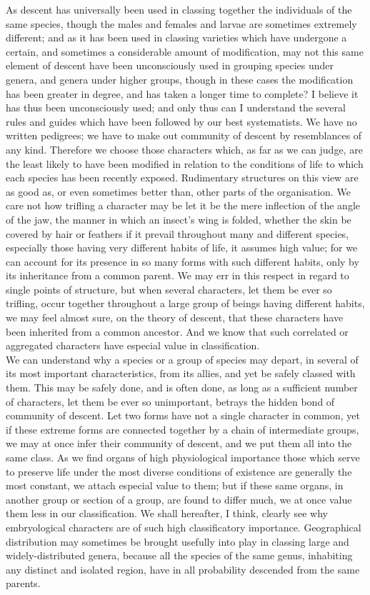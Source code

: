\indent As descent has universally been used in classing together the individuals of the same species, though the males and females and larvae are sometimes extremely different; and as it has been used in classing varieties which have undergone a certain, and sometimes a considerable amount of modification, may not this same element of descent have been unconsciously used in grouping species under genera, and genera under higher groups, though in these cases the modification has been greater in degree, and has taken a longer time to complete? I believe it has thus been unconsciously used; and only thus can I understand the several rules and guides which have been followed by our best systematists. We have no written pedigrees; we have to make out community of descent by resemblances of any kind. Therefore we choose those characters which, as far as we can judge, are the least likely to have been modified in relation to the conditions of life to which each species has been recently exposed. Rudimentary structures on this view are as good as, or even sometimes better than, other parts of the organisation. We care not how trifling a character may be let it be the mere inflection of the angle of the jaw, the manner in which an insect's wing is folded, whether the skin be covered by hair or feathers if it prevail throughout many and different species, especially those having very different habits of life, it assumes high value; for we can account for its presence in so many forms with such different habits, only by its inheritance from a common parent. We may err in this respect in regard to single points of structure, but when several characters, let them be ever so trifling, occur together throughout a large group of beings having different habits, we may feel almost sure, on the theory of descent, that these characters have been inherited from a common ancestor. And we know that such correlated or aggregated characters have especial value in classification.~\\
\indent We can understand why a species or a group of species may depart, in several of its most important characteristics, from its allies, and yet be safely classed with them. This may be safely done, and is often done, as long as a sufficient number of characters, let them be ever so unimportant, betrays the hidden bond of community of descent. Let two forms have not a single character in common, yet if these extreme forms are connected together by a chain of intermediate groups, we may at once infer their community of descent, and we put them all into the same class. As we find organs of high physiological importance those which serve to preserve life under the most diverse conditions of existence are generally the most constant, we attach especial value to them; but if these same organs, in another group or section of a group, are found to differ much, we at once value them less in our classification. We shall hereafter, I think, clearly see why embryological characters are of such high classificatory importance. Geographical distribution may sometimes be brought usefully into play in classing large and widely-distributed genera, because all the species of the same genus, inhabiting any distinct and isolated region, have in all probability descended from the same parents.~\\
